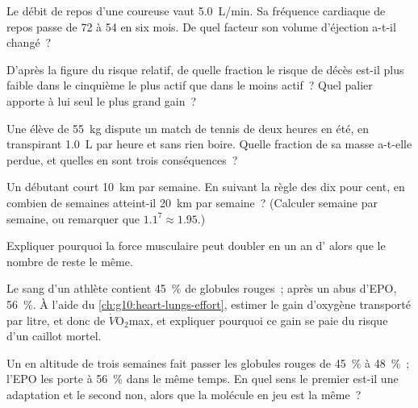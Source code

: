 \begin{exercise}[$\star\star$]\label{exo:g10:sport-and-health:7}
Le débit de repos d'une coureuse vaut \qty{5.0}{L/min}. Sa fréquence
cardiaque de repos passe de 72 à 54 en six mois. De quel facteur son
volume d'éjection a-t-il changé~?
\end{exercise}

\begin{exercise}[$\star\star$]\label{exo:g10:sport-and-health:8}
D'après la figure du risque relatif, de quelle fraction le risque de
décès est-il plus faible dans le cinquième le plus actif que dans le
moins actif~? Quel palier apporte à lui seul le plus grand gain~?
\end{exercise}

\begin{exercise}[$\star\star$]\label{exo:g10:sport-and-health:9}
Une élève de \qty{55}{kg} dispute un match de tennis de deux heures en
été, en transpirant \qty{1.0}{L} par heure et sans rien boire. Quelle
fraction de sa masse a-t-elle perdue, et quelles en sont trois
conséquences~?
\end{exercise}

\begin{exercise}[$\star\star$]\label{exo:g10:sport-and-health:10}
Un débutant court \qty{10}{km} par semaine. En suivant la règle des dix
pour cent, en combien de semaines atteint-il \qty{20}{km} par semaine~?
(Calculer semaine par semaine, ou remarquer que
$1.1^7 \approx 1.95$.)
\end{exercise}

\begin{exercise}[$\star\star$]\label{exo:g10:sport-and-health:11}
Expliquer pourquoi la force musculaire peut doubler en un an
d' alors que le nombre de  reste le même.
\end{exercise}

\begin{exercise}[$\star\star\star$]\label{exo:g10:sport-and-health:12}
Le sang d'un athlète contient 45~\% de globules rouges~; après un abus
d'EPO, 56~\%. À l'aide du \cref{ch:g10:heart-lungs-effort}, estimer le
gain d'oxygène transporté par litre, et donc de
$\dot V\!\mathrm{O_2}$max, et expliquer pourquoi ce gain se paie du
risque d'un caillot mortel.
\end{exercise}

\begin{exercise}[$\star\star\star$]\label{exo:g10:sport-and-health:13}
Un  en altitude de trois semaines fait passer les globules
rouges de 45~\% à 48~\%~; l'EPO les porte à 56~\% dans le même temps.
En quel sens le premier est-il une adaptation et le second non, alors
que la molécule en jeu est la même~?
\end{exercise}


